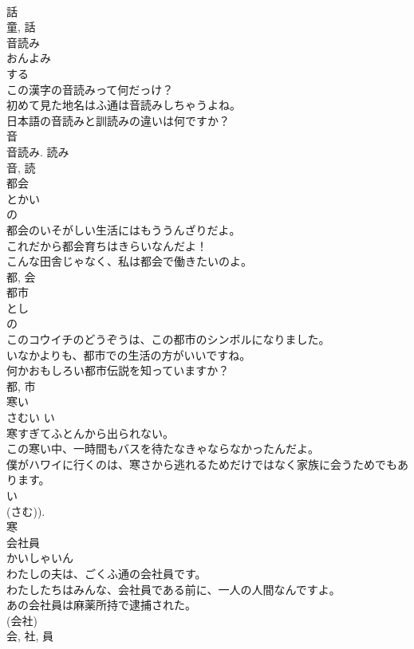 \documentclass[8pt]{extreport}
\begin{document}
\begin{CJK}{UTF8}{min}
\\	話 
\\	童, 話	
\\	音読み	
\\	おんよみ	
\\	する 
\\	この漢字の音読みって何だっけ？	
\\	初めて見た地名はふ通は音読みしちゃうよね。	
\\	日本語の音読みと訓読みの違いは何ですか？	
\\	音 
\\	音読み. 読み 
\\	音, 読	
\\	都会	
\\	とかい	
\\	の 
\\	都会のいそがしい生活にはもううんざりだよ。	
\\	これだから都会育ちはきらいなんだよ！	
\\	こんな田舎じゃなく、私は都会で働きたいのよ。	
\\	都, 会	
\\	都市	
\\	とし	
\\	の 
\\	このコウイチのどうぞうは、この都市のシンボルになりました。	
\\	いなかよりも、都市での生活の方がいいですね。	
\\	何かおもしろい都市伝説を知っていますか？	
\\	都, 市	
\\	寒い	
\\	さむい	い 
\\	寒すぎてふとんから出られない。	
\\	この寒い中、一時間もバスを待たなきゃならなかったんだよ。	
\\	僕がハワイに行くのは、寒さから逃れるためだけではなく家族に会うためでもあります。	
\\	い 
\\	(さむ)). 
\\	寒	
\\	会社員	
\\	かいしゃいん	
\\	わたしの夫は、ごくふ通の会社員です。	
\\	わたしたちはみんな、会社員である前に、一人の人間なんですよ。	
\\	あの会社員は麻薬所持で逮捕された。	
\\	(会社) 
\\	会, 社, 員	

\end{CJK}
\end{document}
